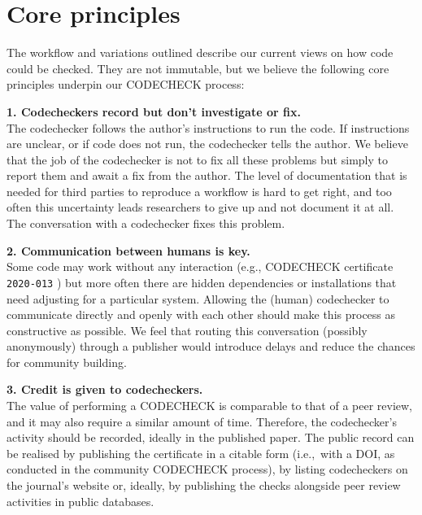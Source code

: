 \documentclass[12pt]{article}
\begin{document}
\section*{Core principles}\label{core-principles}

The workflow and variations outlined describe our current
views on how code could be checked.  They are not immutable, but
we believe the following core principles underpin our CODECHECK
process:

\textbf{1. Codecheckers record but don't investigate or fix.} \\
The codechecker follows the author's instructions to run the code. If
instructions are unclear, or if code does not run, the codechecker
tells the author. We believe that the job of the codechecker is not to
fix all these problems but simply to report them and await a fix from
the author.  The level of documentation that is needed for third
parties to reproduce a workflow is hard to get right, and
too often this uncertainty leads researchers to give up and not
document it at all.  The conversation with a codechecker fixes this
problem.

\textbf{2. Communication between humans is key.} \\ 
Some code may
work without any interaction (e.g., CODECHECK certificate \texttt{2020-013}
\cite{cert-2020-013}) but more often there are hidden
dependencies or installations that need adjusting for a particular system.
Allowing the (human) codechecker to communicate
directly and openly with each other should make this process as
constructive as possible. We feel that routing this conversation
(possibly anonymously) through a publisher would introduce delays and
reduce the chances for community building.

\textbf{3. Credit is given to codecheckers.} \\
The value of performing a CODECHECK is comparable to that of a peer
review, and it may also require a similar amount of time. Therefore,
the codechecker's activity should be recorded, ideally in the
published paper.  The public record can be realised by publishing the
certificate in a citable form (i.e.,~with a DOI, as conducted in the
community CODECHECK process), by listing codecheckers on the journal's
website or, ideally, by publishing the checks alongside peer review
activities in public databases.
\end{document}
